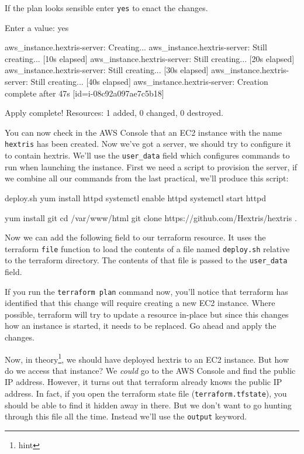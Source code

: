 \documentclass{csse4400}
\begin{document}
If the plan looks sensible enter \texttt{yes} to enact the changes.

\begin{code}[language=terraform-plan]{}
  Enter a value: yes

aws_instance.hextris-server: Creating...
aws_instance.hextris-server: Still creating... [10s elapsed]
aws_instance.hextris-server: Still creating... [20s elapsed]
aws_instance.hextris-server: Still creating... [30s elapsed]
aws_instance.hextris-server: Still creating... [40s elapsed]
aws_instance.hextris-server: Creation complete after 47s [id=i-08c92a097ae7c5b18]

Apply complete! Resources: 1 added, 0 changed, 0 destroyed.
\end{code}

You can now check in the AWS Console that an EC2 instance with the name \texttt{hextris} has been created.
Now we've got a server, we should try to configure it to contain hextris.
We'll use the \texttt{user\_data} field which configures commands to run when launching the instance.
First we need a script to provision the server, if we combine all our commands from the last practical, we'll produce this script:

\begin{code}[language=bash]{deploy.sh}
yum install httpd
systemctl enable httpd
systemctl start httpd

yum install git
cd /var/www/html
git clone https://github.com/Hextris/hextris .  
\end{code}

Now we can add the following field to our terraform resource.
It uses the terraform \texttt{file} function to load the contents of a file named \texttt{deploy.sh} relative to the terraform directory.
The contents of that file is passed to the \texttt{user\_data} field.


If you run the \texttt{terraform plan} command now,
you'll notice that terraform has identified that this change will require creating a new EC2 instance.
Where possible, terraform will try to update a resource in-place but since this changes how an instance is started, it needs to be replaced.
Go ahead and apply the changes.

Now, in theory\footnote{hint}, we should have deployed hextris to an EC2 instance.
But how do we access that instance?
We \textsl{could} go to the AWS Console and find the public IP address.
However, it turns out that terraform already knows the public IP address.
In fact, if you open the terraform state file (\texttt{terraform.tfstate}),
you should be able to find it hidden away in there.
But we don't want to go hunting through this file all the time.
Instead we'll use the \texttt{output} keyword.
\end{document}
